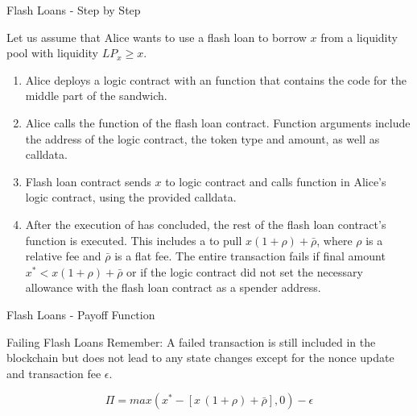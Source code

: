 \documentclass[handout]{beamer}
\begin{document}
\begin{frame}{Flash Loans - Step by Step}

\small

Let us assume that Alice wants to use a flash loan to borrow $x$ from a liquidity pool with liquidity $LP_x \geq x$. \\

\begin{enumerate}
	\item<2->[1.] Alice deploys a logic contract with an  function that contains the code for the middle part of the sandwich. %
	\item<3->[2a.] Alice calls the  function of the flash loan contract. Function arguments include the address of the logic contract, the token type and amount, as well as calldata.
	\item<4->[2b.] Flash loan contract sends $x$ to logic contract and calls  function in Alice's logic contract, using the provided calldata.
	\item<5->[2c.] After the execution of  has concluded, the rest of the flash loan contract's  function is executed. This includes a  to pull $x(1+\rho)+\bar{\rho}$, where $\rho$ is a relative fee and $\bar{\rho}$ is a flat fee. The entire transaction fails if final amount $x^* < x(1+\rho)+\bar{\rho}$ or if the logic contract did not set the necessary allowance with the flash loan contract as a spender address.
\end{enumerate}

\end{frame}


\begin{frame}{Flash Loans - Payoff Function}

\begin{keytakeaway}{Failing Flash Loans}
		Remember: A failed transaction is still included in the blockchain but does not lead to any state changes except for the nonce update and transaction fee $\epsilon$. 
\end{keytakeaway}

\vspace{0.5 em}

\small{
\begin{equation*}
	\Pi = max (x^{\ast}-[x \,(1+\rho) + \bar{\rho} ],0) - \epsilon
\end{equation*}
}

	
\end{frame}
\end{document}
